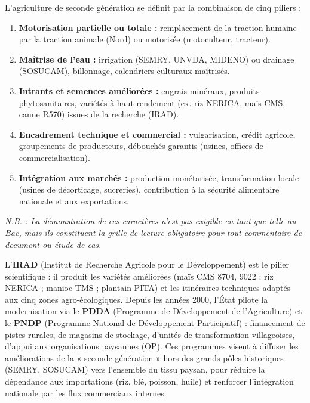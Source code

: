 \documentclass[11pt]{article}
\begin{document}
\begin{propriete}
L'agriculture de seconde génération se définit par la combinaison de cinq piliers :
\begin{enumerate}
\item \textbf{Motorisation partielle ou totale :} remplacement de la traction humaine par la traction animale (Nord) ou motorisée (motoculteur, tracteur).
\item \textbf{Maîtrise de l'eau :} irrigation (SEMRY, UNVDA, MIDENO) ou drainage (SOSUCAM), billonnage, calendriers culturaux maîtrisés.
\item \textbf{Intrants et semences améliorées :} engrais minéraux, produits phytosanitaires, variétés à haut rendement (ex. riz NERICA, maïs CMS, canne R570) issues de la recherche (IRAD).
\item \textbf{Encadrement technique et commercial :} vulgarisation, crédit agricole, groupements de producteurs, débouchés garantis (usines, offices de commercialisation).
\item \textbf{Intégration aux marchés :} production monétarisée, transformation locale (usines de décorticage, sucreries), contribution à la sécurité alimentaire nationale et aux exportations.
\end{enumerate}
\textit{N.B. : La démonstration de ces caractères n'est pas exigible en tant que telle au Bac, mais ils constituent la grille de lecture obligatoire pour tout commentaire de document ou étude de cas.}
\end{propriete}

\begin{savaistu}
L'\textbf{IRAD} (Institut de Recherche Agricole pour le Développement) est le pilier scientifique : il produit les variétés améliorées (maïs CMS 8704, 9022 ; riz NERICA ; manioc TMS ; plantain PITA) et les itinéraires techniques adaptés aux cinq zones agro-écologiques. Depuis les années 2000, l'État pilote la modernisation via le \textbf{PDDA} (Programme de Développement de l'Agriculture) et le \textbf{PNDP} (Programme National de Développement Participatif) : financement de pistes rurales, de magasins de stockage, d'unités de transformation villageoises, d'appui aux organisations paysannes (OP). Ces programmes visent à diffuser les améliorations de la « seconde génération » hors des grands pôles historiques (SEMRY, SOSUCAM) vers l'ensemble du tissu paysan, pour réduire la dépendance aux importations (riz, blé, poisson, huile) et renforcer l'intégration nationale par les flux commerciaux internes.
\end{savaistu}
\end{document}
